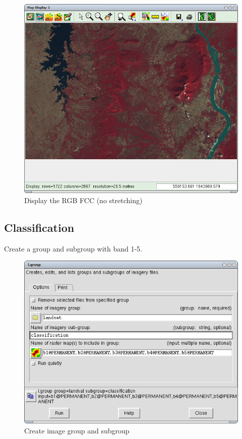 \begin{figure}[htbp]
   \centering
   \includegraphics[scale=0.35]{grass_rs007.png}
   \caption{Display the RGB FCC (no stretching)}
   \label{fig:grass_rs007}
\end{figure}

\subsection{Classification}
\label{classification}

Create a group and subgroup with band 1-5.

\begin{figure}[htbp]
   \centering
   \includegraphics[scale=0.35]{grass_rs008.png}
   \caption{Create image group and subgroup}
   \label{fig:grass_rs008}
\end{figure}

